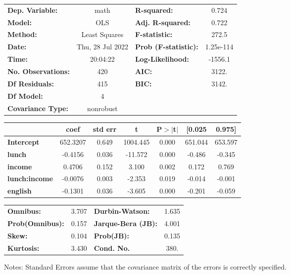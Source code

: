 \begin{center}
\begin{tabular}{lclc}
\toprule
\textbf{Dep. Variable:}    &       math       & \textbf{  R-squared:         } &     0.724   \\
\textbf{Model:}            &       OLS        & \textbf{  Adj. R-squared:    } &     0.722   \\
\textbf{Method:}           &  Least Squares   & \textbf{  F-statistic:       } &     272.5   \\
\textbf{Date:}             & Thu, 28 Jul 2022 & \textbf{  Prob (F-statistic):} & 1.25e-114   \\
\textbf{Time:}             &     20:04:22     & \textbf{  Log-Likelihood:    } &   -1556.1   \\
\textbf{No. Observations:} &         420      & \textbf{  AIC:               } &     3122.   \\
\textbf{Df Residuals:}     &         415      & \textbf{  BIC:               } &     3142.   \\
\textbf{Df Model:}         &           4      & \textbf{                     } &             \\
\textbf{Covariance Type:}  &    nonrobust     & \textbf{                     } &             \\
\bottomrule
\end{tabular}
\begin{tabular}{lcccccc}
                      & \textbf{coef} & \textbf{std err} & \textbf{t} & \textbf{P$> |$t$|$} & \textbf{[0.025} & \textbf{0.975]}  \\
\midrule
\textbf{Intercept}    &     652.3207  &        0.649     &  1004.445  &         0.000        &      651.044    &      653.597     \\
\textbf{lunch}        &      -0.4156  &        0.036     &   -11.572  &         0.000        &       -0.486    &       -0.345     \\
\textbf{income}       &       0.4706  &        0.152     &     3.100  &         0.002        &        0.172    &        0.769     \\
\textbf{lunch:income} &      -0.0076  &        0.003     &    -2.353  &         0.019        &       -0.014    &       -0.001     \\
\textbf{english}      &      -0.1301  &        0.036     &    -3.605  &         0.000        &       -0.201    &       -0.059     \\
\bottomrule
\end{tabular}
\begin{tabular}{lclc}
\textbf{Omnibus:}       &  3.707 & \textbf{  Durbin-Watson:     } &    1.635  \\
\textbf{Prob(Omnibus):} &  0.157 & \textbf{  Jarque-Bera (JB):  } &    4.001  \\
\textbf{Skew:}          &  0.104 & \textbf{  Prob(JB):          } &    0.135  \\
\textbf{Kurtosis:}      &  3.430 & \textbf{  Cond. No.          } &     380.  \\
\bottomrule
\end{tabular}
\end{center}

Notes: \newline
 [1] Standard Errors assume that the covariance matrix of the errors is correctly specified.